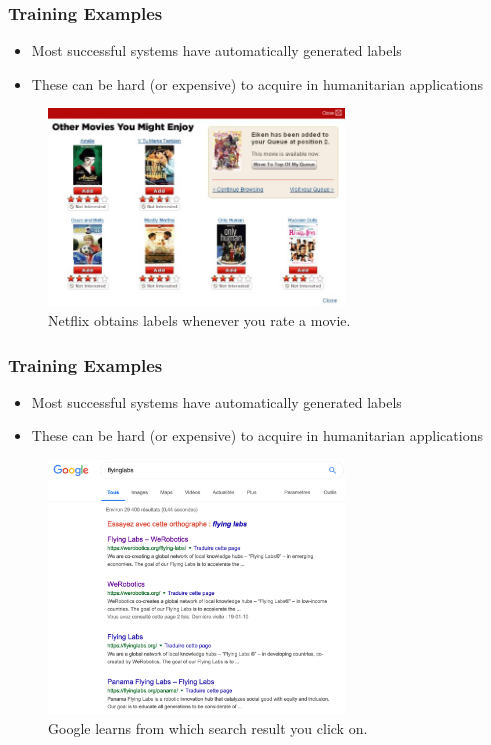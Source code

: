 \documentclass[10pt,mathserif]{beamer}
\begin{document}
\begin{frame}
  \frametitle{Training Examples}
  \begin{itemize}
  \item Most successful systems have automatically generated labels
  \item These can be hard (or expensive) to acquire in humanitarian applications
  \end{itemize} 
  \begin{figure}[ht]
    \centering
    \includegraphics[width=0.7\textwidth]{figures/netflix_abstraction}
    \caption{Netflix obtains labels whenever you rate a movie. \label{fig:label} }
  \end{figure}
\end{frame}

\begin{frame}
  \frametitle{Training Examples}
  \begin{itemize}
  \item Most successful systems have automatically generated labels
  \item These can be hard (or expensive) to acquire in humanitarian applications
  \end{itemize} 
  \begin{figure}[ht]
    \centering
    \includegraphics[width=0.7\textwidth]{figures/flyinglabs.png}
    \caption{Google learns from which search result you click
      on. \label{fig:label} }
  \end{figure}
\end{frame}
\end{document}
